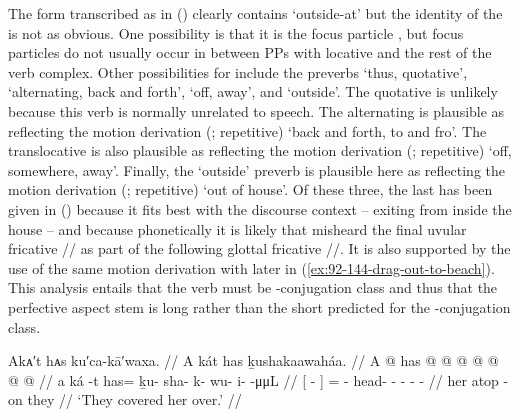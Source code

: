 The form transcribed as  in (\lastx) clearly contains  ‘outside-at’ but the identity of the  is not as obvious.
One possibility is that it is the focus particle , but focus particles do not usually occur in between PPs with locative  and the rest of the verb complex.
Other possibilities for  include the preverbs  ‘thus, quotative’,  ‘alternating, back and forth’,  ‘off, away’, and  ‘outside’.
The quotative  is unlikely because this verb is normally unrelated to speech.
The alternating  is plausible as reflecting the motion derivation  (;  repetitive) ‘back and forth, to and fro’.
The translocative  is also plausible as reflecting the motion derivation  (;  repetitive) ‘off, somewhere, away’.
Finally, the  ‘outside’ preverb is plausible here as reflecting the motion derivation  (;  repetitive) ‘out of house’.
Of these three, the last has been given in (\lastx) because it fits best with the discourse context – exiting from inside the house – and because phonetically it is likely that \citeauthor{swanton:1909} misheard the final uvular fricative // as part of the following glottal fricative //.
It is also supported by the use of the same motion derivation with  later in (\ref{ex:92-144-drag-out-to-beach}).
This analysis entails that the verb must be -conjugation class and thus that the perfective aspect stem is long  rather than the short  predicted for the -conjugation class.

\ex\label{ex:92-137-buried-her}%
%
\begingl
	\glpreamble	Akᴀ′t hᴀs ku′ca-kā′waxa. //
	\glpreamble	A kát has ḵushakaawaháa. //
	\gla	{} A  @ {} {}
		has @  @ {} @ {} @ {} @ {} @ {} @ {} //
	\glb	{} a ká -t {}
		has= ḵu- sha- k- wu- i-  -μμL //
	\glc	{}[   - {}]
		= - head- - - -
			 - //
	\gld	{} her atop -on {}
		they\•  {} {} {} {} {} {} //
	\glft	‘They covered her over.’
		//
\endgl
\xe


